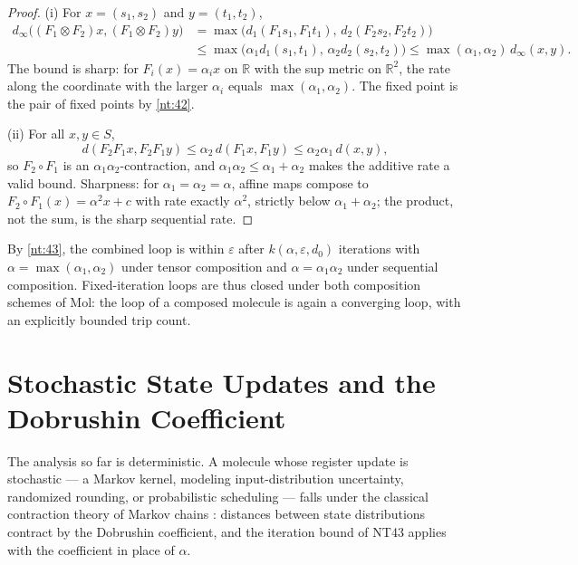 \begin{proof}
(i) For $x = (s_1,s_2)$ and $y = (t_1,t_2)$,
\begin{align*}
d_\infty\bigl((F_1\otimes F_2)x,(F_1\otimes F_2)y\bigr)
 &= \max\bigl(d_1(F_1s_1,F_1t_1),\,d_2(F_2s_2,F_2t_2)\bigr)\\
 &\leq \max\bigl(\alpha_1 d_1(s_1,t_1),\,\alpha_2 d_2(s_2,t_2)\bigr)
  \leq \max(\alpha_1,\alpha_2)\,d_\infty(x,y).
\end{align*}
The bound is sharp: for $F_i(x) = \alpha_i x$ on $\mathbb{R}$ with the sup metric on $\mathbb{R}^2$, the rate along the coordinate with the larger $\alpha_i$ equals $\max(\alpha_1,\alpha_2)$. The fixed point is the pair of fixed points by \autoref{nt:42}.

(ii) For all $x,y \in S$,
\[ d(F_2F_1x,F_2F_1y) \leq \alpha_2\,d(F_1x,F_1y) \leq \alpha_2\alpha_1\,d(x,y), \]
so $F_2 \circ F_1$ is an $\alpha_1\alpha_2$-contraction, and $\alpha_1\alpha_2 \leq \alpha_1 + \alpha_2$ makes the additive rate a valid bound. Sharpness: for $\alpha_1 = \alpha_2 = \alpha$, affine maps compose to $F_2 \circ F_1(x) = \alpha^2 x + c$ with rate exactly $\alpha^2$, strictly below $\alpha_1 + \alpha_2$; the product, not the sum, is the sharp sequential rate.
\end{proof}

\begin{remark}
By \autoref{nt:43}, the combined loop is within $\varepsilon$ after $k(\alpha,\varepsilon,d_0)$ iterations with $\alpha = \max(\alpha_1,\alpha_2)$ under tensor composition and $\alpha = \alpha_1\alpha_2$ under sequential composition. Fixed-iteration loops are thus closed under both composition schemes of Mol: the loop of a composed molecule is again a converging loop, with an explicitly bounded trip count.
\end{remark}

\section{Stochastic State Updates and the Dobrushin Coefficient}\label{sec:trace-markov}

The analysis so far is deterministic. A molecule whose register update is stochastic --- a Markov kernel, modeling input-distribution uncertainty, randomized rounding, or probabilistic scheduling --- falls under the classical contraction theory of Markov chains \citep{dobroushin}: distances between state distributions contract by the Dobrushin coefficient, and the iteration bound of NT43 applies with the coefficient in place of $\alpha$.

